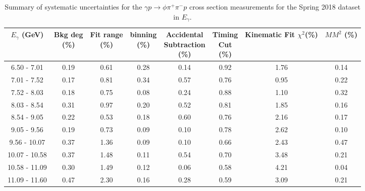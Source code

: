 \begin{center}
\null
\vfill
\begin{table}[!htbp]
    \small
    \centering
    \caption{Summary of systematic uncertainties for the $\gamma p \rightarrow \phi \pi^{+} \pi^{-} p$ cross section measurements for the Spring 2018 dataset in $E_{\gamma}$.}
    \label{tab.y2175.syserr.phi2pi.3.1}
    \begin{tabular}{|c|c|c|c|c|c|c|c|}
        \hline
        $E_{\gamma}$ (GeV)&\thead{Bkg deg\\(\%)}&\thead{Fit range\\(\%)}&\thead{binning\\(\%)}&\thead{Accidental\\Subtraction\\(\%)}&\thead{Timing\\Cut\\(\%)}&\thead{Kinematic\\Fit $\chi^{2}$(\%)}&\thead{$MM^{2}$\\(\%)}\\
        \hline
        6.50 - 7.01 & 0.19 & 0.61 & 0.28 & 0.14 & 0.92 & 1.76 & 0.14 \\ 
        7.01 - 7.52 & 0.17 & 0.81 & 0.34 & 0.57 & 0.76 & 0.95 & 0.22 \\ 
        7.52 - 8.03 & 0.18 & 0.75 & 0.08 & 0.24 & 0.88 & 1.10 & 0.32 \\ 
        8.03 - 8.54 & 0.31 & 0.97 & 0.20 & 0.52 & 0.81 & 1.85 & 0.16 \\ 
        8.54 - 9.05 & 0.22 & 0.53 & 0.18 & 0.60 & 0.76 & 2.16 & 0.17 \\ 
        9.05 - 9.56 & 0.19 & 0.73 & 0.09 & 0.10 & 0.78 & 2.62 & 0.10 \\ 
        9.56 - 10.07 & 0.37 & 1.36 & 0.09 & 0.10 & 0.66 & 2.43 & 0.47 \\ 
        10.07 - 10.58 & 0.37 & 1.48 & 0.11 & 0.54 & 0.70 & 3.48 & 0.21 \\ 
        10.58 - 11.09 & 0.30 & 1.49 & 0.12 & 0.06 & 0.58 & 4.21 & 0.04 \\ 
        11.09 - 11.60 & 0.47 & 2.30 & 0.16 & 0.28 & 0.59 & 3.09 & 0.21 \\
        \hline
    \end{tabular}
\end{table}
\end{center}

